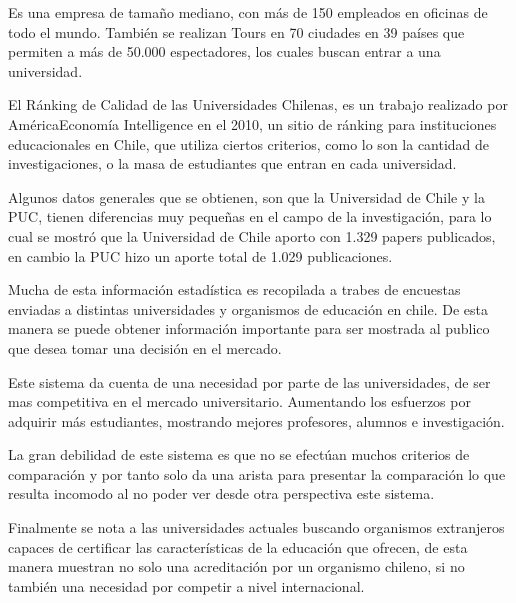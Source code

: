 \documentclass[a4paper,12pt,openany,oneside]{book}
\begin{document}
Es una empresa de tamaño mediano, con más de 150 empleados en oficinas de todo el mundo. También se realizan Tours en 70 ciudades en 39 países que permiten a más de 50.000 espectadores, los cuales buscan entrar a una universidad\cite{data2}.

El Ránking de Calidad de las Universidades Chilenas, es un trabajo realizado por AméricaEconomía Intelligence en el 2010, un sitio de ránking para instituciones educacionales en Chile, que utiliza ciertos criterios, como lo son la cantidad de investigaciones, o la masa de estudiantes que entran en cada universidad.

Algunos datos generales que se obtienen, son que la Universidad de Chile y la PUC, tienen diferencias muy pequeñas en el campo de la investigación, para lo cual se mostró que la Universidad de Chile aporto con 1.329 papers publicados, en cambio la PUC hizo un aporte total de 1.029 publicaciones.

Mucha de esta información estadística es recopilada a trabes de encuestas enviadas a distintas universidades y organismos de educación en chile. De esta manera se puede obtener información importante para ser mostrada al publico que desea tomar una decisión en el mercado.

Este sistema da cuenta de una necesidad por parte de las universidades, de ser mas competitiva en el mercado universitario. Aumentando los esfuerzos por adquirir más estudiantes, mostrando mejores profesores, alumnos e investigación.

La gran debilidad de este sistema es que no se efectúan muchos criterios de comparación y por tanto solo da una arista para presentar la comparación lo que resulta incomodo al no poder ver desde otra perspectiva este sistema.

Finalmente se nota a las universidades actuales buscando organismos extranjeros capaces de certificar las características de la educación que ofrecen, de esta manera muestran no solo una acreditación por un organismo chileno, si no también una necesidad por competir a nivel internacional\cite{data3}.



\end{document}
